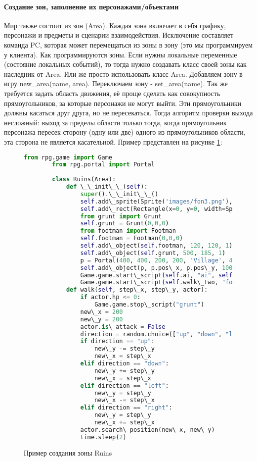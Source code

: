 \paragraph{Создание зон, заполнение их персонажами/объектами}
Мир также состоит из зон (Area). Каждая зона включает в себя графику, персонажи и предметы и сценарии взаимодействия. Исключение составляет команда PC, которая может перемещаться из зоны в зону (это мы программируем у клиента). Как программируются зоны. Если нужны локальные переменные (состояние локальных событий), то тогда нужно создавать класс своей зоны как наследник от Area. Или же просто использовать класс Area. Добавляем зону в игру new\_area(name, area). Переключаем зону - set\_area(name). Так же требуется задать область движения, её проще сделать как совокупность прямоугольников, за которые персонажи не могут выйти. Эти прямоугольники должны касаться друг друга, но не пересекаться. Тогда алгоритм проверки выхода несложный: выход за пределы области только тогда, когда прямоугольник персонажа пересек сторону (одну или две) одного из прямоугольников области, эта сторона не является касательной.
Пример представлен на рисунке \ref{area:image}:
\begin{figure}[H]
	\begin{lstlisting}[language=Python]
		from rpg.game import Game
		from rpg.portal import Portal
		
		class Ruins(Area):
			def \_\_init\_\_(self):
				super().\_\_init\_\_()
				self.add\_sprite(Sprite('images/fon3.png'), 590, 400, 0)
				self.add\_rect(Rectangle(x=0, y=0, width=Sprite('images/fon3.png').image.width(),\\ height=Sprite('images/fon3.png').image.height()))
				from grunt import Grunt
				self.grunt = Grunt(0,0,0)
				from footman import Footman
				self.footman = Footman(0,0,0)
				self.add\_object(self.footman, 120, 120, 1)
				self.add\_object(self.grunt, 500, 185, 1)
				p = Portal(400, 400, 200, 200, 'Village', 480, 100)
				self.add\_object(p, p.pos\_x, p.pos\_y, 100)
				Game.game.start\_script(self.ai, "ai", self.grunt)
				Game.game.start\_script(self.walk\_two, "footman", 50, 50)		
			def walk(self, step\_x, step\_y, actor):
				if actor.hp <= 0:
					Game.game.stop\_script("grunt")
				new\_x = 200
				new\_y = 200
				actor.is\_attack = False
				direction = random.choice(["up", "down", "left", "right"])
				if direction == "up":
					new\_y -= step\_y
					new\_x = step\_x
				elif direction == "down":
					new\_y += step\_y
					new\_x = step\_x
				elif direction == "left":
					new\_y = step\_y
					new\_x -= step\_x
				elif direction == "right":
					new\_y = step\_y
					new\_x += step\_x		
				actor.search\_position(new\_x, new\_y)
				time.sleep(2)
	\end{lstlisting}  
\caption{Пример создания зоны Ruins}
\label{area:image}
\end{figure}


